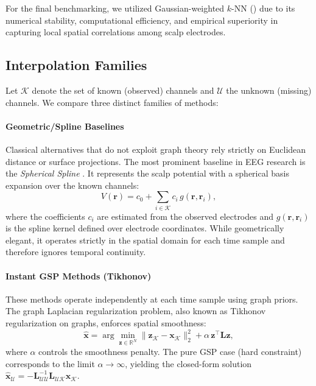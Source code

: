 For the final benchmarking, we utilized Gaussian-weighted $k$-NN () due to its numerical stability, computational efficiency, and empirical superiority in capturing local spatial correlations among scalp electrodes.

\subsection{Interpolation Families}

Let $\mathcal{K}$ denote the set of known (observed) channels and $\mathcal{U}$ the unknown (missing) channels. We compare three distinct families of methods:

\paragraph{Geometric/Spline Baselines} 
Classical alternatives that do not exploit graph theory rely strictly on Euclidean distance or surface projections. The most prominent baseline in EEG research is the \emph{Spherical Spline} \cite{perrin1989}. It represents the scalp potential with a spherical basis expansion over the known channels:
\begin{equation}
V(\mathbf{r}) = c_0 + \sum_{i \in \mathcal{K}} c_i \, g(\mathbf{r}, \mathbf{r}_i),
\end{equation}
where the coefficients $c_i$ are estimated from the observed electrodes and $g(\mathbf{r}, \mathbf{r}_i)$ is the spline kernel defined over electrode coordinates. While geometrically elegant, it operates strictly in the spatial domain for each time sample and therefore ignores temporal continuity.

\paragraph{Instant GSP Methods (Tikhonov)} 
These methods operate independently at each time sample using graph priors. The graph Laplacian regularization problem, also known as Tikhonov regularization on graphs, enforces spatial smoothness:
\begin{equation}
  \hat{\mathbf{x}} = \arg\min_{\mathbf{z} \in \mathbb{R}^N}
    \|\mathbf{z}_{\mathcal{K}} - \mathbf{x}_{\mathcal{K}}\|_2^2 + \alpha \, \mathbf{z}^\top \mathbf{L} \mathbf{z},
  \label{eq:tikhonov}
\end{equation}
where $\alpha$ controls the smoothness penalty. The pure GSP case (hard constraint) corresponds to the limit $\alpha \to \infty$, yielding the closed-form solution $\hat{\mathbf{x}}_{\mathcal{U}} = -\mathbf{L}_{\mathcal{U}\mathcal{U}}^{-1} \mathbf{L}_{\mathcal{U}\mathcal{K}} \mathbf{x}_{\mathcal{K}}$. 

